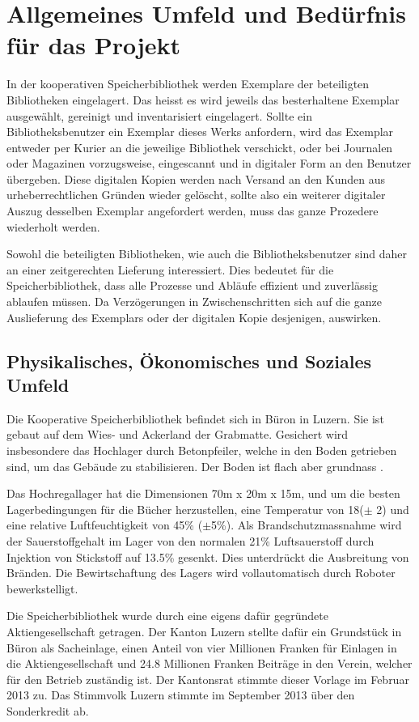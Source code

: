 \chapter{Allgemeines Umfeld und Bedürfnis für das Projekt}
In der kooperativen Speicherbibliothek werden Exemplare der beteiligten Bibliotheken eingelagert. Das heisst es wird jeweils das besterhaltene Exemplar ausgewählt, gereinigt und inventarisiert eingelagert. Sollte ein Bibliotheksbenutzer ein Exemplar dieses Werks anfordern, wird das Exemplar entweder per Kurier an die jeweilige Bibliothek verschickt, oder bei Journalen oder Magazinen vorzugsweise, eingescannt und in digitaler Form an den Benutzer übergeben. Diese digitalen Kopien werden nach Versand an den Kunden aus urheberrechtlichen Gründen wieder gelöscht, sollte also ein weiterer digitaler Auszug desselben Exemplar angefordert werden, muss das ganze Prozedere wiederholt werden.

Sowohl die beteiligten Bibliotheken, wie auch die Bibliotheksbenutzer sind daher an einer zeitgerechten Lieferung interessiert. Dies bedeutet für die Speicherbibliothek, dass alle Prozesse und Abläufe effizient und zuverlässig ablaufen müssen. Da Verzögerungen in Zwischenschritten sich auf die ganze Auslieferung des Exemplars oder der digitalen Kopie desjenigen, auswirken.

\section{Physikalisches, Ökonomisches und Soziales Umfeld}
Die Kooperative Speicherbibliothek befindet sich in Büron in Luzern. Sie ist gebaut auf dem Wies- und Ackerland der Grabmatte. Gesichert wird insbesondere das Hochlager durch Betonpfeiler, welche in den Boden getrieben sind, um das Gebäude zu stabilisieren. Der Boden ist flach aber grundnass \parencite{MapGeoAdmin2019}.

Das Hochregallager hat die Dimensionen 70m x 20m x 15m, und um die besten Lagerbedingungen für die Bücher herzustellen, eine Temperatur von 18\SIUnitSymbolDegree ($\pm$ 2) und eine relative Luftfeuchtigkeit von 45\% ($\pm$5\%). Als Brandschutzmassnahme wird der Sauerstoffgehalt im Lager von den normalen 21\% Luftsauerstoff durch Injektion von Stickstoff auf 13.5\% gesenkt. Dies unterdrückt die Ausbreitung von Bränden.
Die Bewirtschaftung des Lagers wird vollautomatisch durch Roboter bewerkstelligt.

Die Speicherbibliothek wurde durch eine eigens dafür gegründete Aktiengesellschaft getragen. Der Kanton Luzern stellte dafür ein Grundstück in Büron als Sacheinlage, einen Anteil von vier Millionen Franken für Einlagen in die Aktiengesellschaft und 24.8 Millionen Franken Beiträge in den Verein, welcher für den Betrieb zuständig ist. Der Kantonsrat stimmte dieser Vorlage im Februar 2013 zu. Das Stimmvolk Luzern stimmte im September 2013 über den Sonderkredit ab. 

